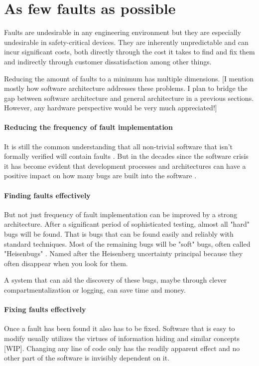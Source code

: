\section{As few faults as possible}
Faults are undesirable in any engineering environment but they are especially undesirable in safety-critical devices. They are inherently unpredictable and can incur significant costs, both directly through the cost it takes to find and fix them and indirectly through customer dissatisfaction among other things.

Reducing the amount of faults to a minimum has multiple dimensions. 
[I mention mostly how software architecture addresses these problems. I plan to bridge the gap between software architecture and general architecture in a previous sections. However, any hardware perspective would be very much appreciated!]
\paragraph{Reducing the frequency of fault implementation}
It is still the common understanding that all non-trivial software that isn't formally verified will contain faults \cite{Klein.2009}. But in the decades since the software crisis it has become evident that development processes and architectures can have a positive impact on how many bugs are built into the software \cite{Randell.1996}.  
\paragraph{Finding faults effectively}
But not just frequency of fault implementation can be improved by a strong architecture. After a significant period of sophisticated testing, almost all "hard" bugs will be found. That is bugs that can be found easily and reliably
with standard techniques. Most of the remaining bugs will be "soft" bugs, often called "Heisenbugs" \cite{Gray.1986}. Named after the Heisenberg uncertainty principal because they often disappear when you look for them. 

A system that can aid the discovery of these bugs, maybe through clever compartmentalization or logging, can save time and money.
\paragraph{Fixing faults effectively}
Once a fault has been found it also has to be fixed. Software that is easy to modify usually utilizes the virtues of information hiding and similar  concepts [WIP]. Changing any line of code only has the readily apparent effect and no other part of the software is invisibly dependent on it.

